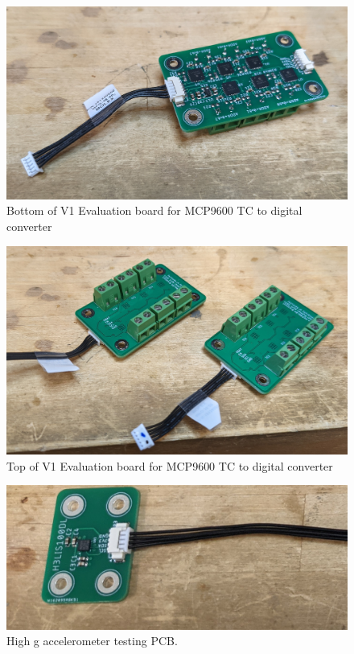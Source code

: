 \documentclass{article}
\begin{document}
\begin{figure}[H]
	\centering
	\includegraphics[width=\textwidth]{images/tc-board-bottom}
	\caption{Bottom of V1 Evaluation board for MCP9600 TC to digital converter}
	\label{fig:tc-board-bottom}
\end{figure}

\begin{figure}[h!]
	\centering
	\includegraphics[width=\textwidth]{images/tc-board-top}
	\caption{Top of V1 Evaluation board for MCP9600 TC to digital converter}
	\label{fig:tc-board-top}
\end{figure}

\begin{figure}[h!]
	\centering
	\includegraphics[width=\textwidth]{images/100g-accel-board}
	\caption{High g accelerometer testing PCB.}
	\label{fig:accel-board}
\end{figure}
\end{document}
